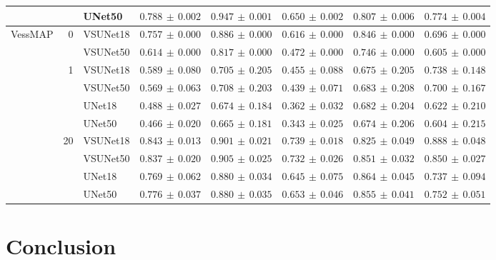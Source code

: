 \documentclass[%
reprint,
nofootinbib,
 amsmath,amssymb,
aps,
superscriptaddress,
showkeys,
longbibliography
]{revtex4-1}
\begin{document}
\begin{table}[t]
\begin{tabular}{l r l r r r r r}
         &  & UNet50 & $0.788 \,\pm\, 0.002$ & $0.947 \,\pm\, 0.001$ & $0.650 \,\pm\, 0.002$ & $0.807 \,\pm\, 0.006$ & $0.774 \,\pm\, 0.004$ \\
        \hline
        \multirow{10}{*}{VessMAP} & \multirow{2}{*}{0} & VSUNet18 & $0.757 \,\pm\, 0.000$ & $0.886 \,\pm\, 0.000$ & $0.616 \,\pm\, 0.000$ & $0.846 \,\pm\, 0.000$ & $0.696 \,\pm\, 0.000$ \\
         &  & VSUNet50 & $0.614 \,\pm\, 0.000$ & $0.817 \,\pm\, 0.000$ & $0.472 \,\pm\, 0.000$ & $0.746 \,\pm\, 0.000$ & $0.605 \,\pm\, 0.000$ \\
         \cline{2-8}
         & \multirow{4}{*}{1} & VSUNet18 & $0.589 \,\pm\, 0.080$ & $0.705 \,\pm\, 0.205$ & $0.455 \,\pm\, 0.088$ & $0.675 \,\pm\, 0.205$ & $0.738 \,\pm\, 0.148$ \\
         &  & VSUNet50 & $0.569 \,\pm\, 0.063$ & $0.708 \,\pm\, 0.203$ & $0.439 \,\pm\, 0.071$ & $0.683 \,\pm\, 0.208$ & $0.700 \,\pm\, 0.167$ \\
         &  & UNet18 & $0.488 \,\pm\, 0.027$ & $0.674 \,\pm\, 0.184$ & $0.362 \,\pm\, 0.032$ & $0.682 \,\pm\, 0.204$ & $0.622 \,\pm\, 0.210$ \\
         &  & UNet50 & $0.466 \,\pm\, 0.020$ & $0.665 \,\pm\, 0.181$ & $0.343 \,\pm\, 0.025$ & $0.674 \,\pm\, 0.206$ & $0.604 \,\pm\, 0.215$ \\
         \cline{2-8}
         & \multirow{4}{*}{20} & VSUNet18 & $0.843 \,\pm\, 0.013$ & $0.901 \,\pm\, 0.021$ & $0.739 \,\pm\, 0.018$ & $0.825 \,\pm\, 0.049$ & $0.888 \,\pm\, 0.048$ \\
         &  & VSUNet50 & $0.837 \,\pm\, 0.020$ & $0.905 \,\pm\, 0.025$ & $0.732 \,\pm\, 0.026$ & $0.851 \,\pm\, 0.032$ & $0.850 \,\pm\, 0.027$ \\
         &  & UNet18 & $0.769 \,\pm\, 0.062$ & $0.880 \,\pm\, 0.034$ & $0.645 \,\pm\, 0.075$ & $0.864 \,\pm\, 0.045$ & $0.737 \,\pm\, 0.094$ \\
         &  & UNet50 & $0.776 \,\pm\, 0.037$ & $0.880 \,\pm\, 0.035$ & $0.653 \,\pm\, 0.046$ & $0.855 \,\pm\, 0.041$ & $0.752 \,\pm\, 0.051$ \\
        \hline
    \end{tabular}
    \endgroup
\end{table}



\section{Conclusion}
\label{s:conclusion}
\end{document}
